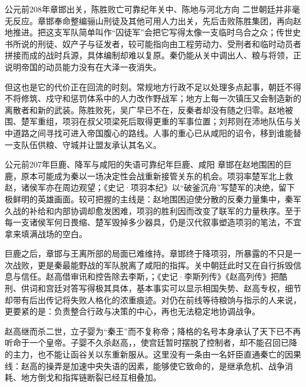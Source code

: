 \begin{event}{公元前208年}{章邯出关，陈胜败亡}{可靠纪年}{关中、陈地与河北方向}
二世朝廷并非毫无反应。章邯奉命整编骊山刑徒及其他可用人力出关，先后击败陈胜集团，再向赵地推进。把这支军队简单叫作“囚徒军”会把它写得太像一支临时乌合之众；传世史书所说的刑徒、奴产子与征发者，较可能指向由工程劳动力、受刑者和临时动员者拼接而成的战时兵源，具体编制却难以复原。秦仍能从关中调出人、粮与将领，正说明帝国的动员能力没有在大泽一夜消失。

但这也是它的代价正在回流的时刻。常规地方行政不足以处理多点起事，朝廷不得不将修筑、戍守和惩罚体系中的人力改作野战军；地方上每一次镇压又会制造新的离散者和新的武装。陈胜败死，吴广早已不在，反秦者却没有随之归零。赵地被围、楚军重组，项羽在叔父项梁死后取得更重的军事位置；刘邦则在沛地队伍与关中道路之间寻找可进入帝国腹心的路线。人事的重心已从咸阳的诏令，移到谁能替一支队伍供粮、守城并让盟友承认其名义。
\end{event}

\begin{event}{公元前207年}{巨鹿、降军与咸阳的失语}{可靠纪年}{巨鹿、咸阳}
章邯在赵地围困的巨鹿，原本可能成为秦以一场决定性会战重新接管关东的机会。项羽率楚军北上救赵，诸侯军亦在周边观望；《史记·项羽本纪》以“破釜沉舟”写楚军的决绝，留下极鲜明的英雄画面。较可把握的主线是：赵地围困迫使分散的反秦力量集中，秦军久战的补给和内部协调却愈发困难，项羽的胜利因而改变了联军的力量秩序。至于每一支诸侯军何日畏缩、楚军毁掉多少器具，仍是汉代叙事塑造项羽的笔法，不宜拿来填满战场的空白。

巨鹿之后，章邯与王离所部的局面已难维持。章邯终于降项羽，所暴露的不只是一次战败，更是秦最能野战的军队脱离了咸阳的指挥。关中朝廷此时又在自行拆毁信息与信任。赵高借审讯和控告除去李斯，；《史记·李斯列传》《赵高列传》把酷刑、供词和宫廷对答写得极其具体，基本事实可以显示相国失势、赵高专权，细节却带有后出传记将失败人格化的浓重痕迹。对仍在前线等待粮饷与指示的人来说，更要紧的是：负责整合行政与决策的中心，再也无法稳定地协调战争。

赵高继而杀二世，立子婴为“秦王”而不复称帝；降格的名号本身承认了天下已不再听命于一个皇帝。子婴不久杀赵高，，使宫廷暂时摆脱了控制者，却不能召回已降的主力，也不能让函谷关以东重新服从。这里没有一条由一名奸臣直通秦亡的因果线：赵高的操弄是加速中央失语的因素，能够使它致命的，是继承危机、战争消耗、地方倒戈和指挥链断裂已经互相叠加。
\end{event}

